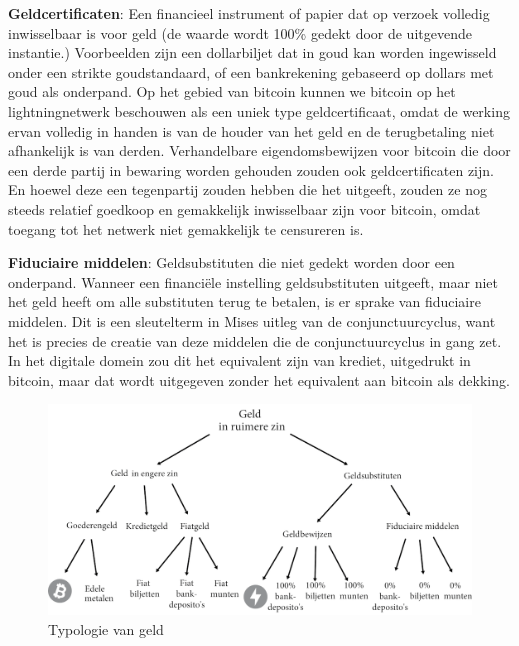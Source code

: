 \vspace{1em}\noindent\textbf{Geldcertificaten}: Een financieel instrument of papier dat op verzoek volledig inwisselbaar is voor geld (de waarde wordt 100\% gedekt door de uitgevende instantie.) Voorbeelden zijn een dollarbiljet dat in goud kan worden ingewisseld onder een strikte goudstandaard, of een bankrekening gebaseerd op dollars met goud als onderpand. Op het gebied van bitcoin kunnen we bitcoin op het lightningnetwerk beschouwen als een uniek type geldcertificaat, omdat de werking ervan volledig in handen is van de houder van het geld en de terugbetaling niet afhankelijk is van derden. Verhandelbare eigendomsbewijzen voor bitcoin die door een derde partij in bewaring worden gehouden zouden ook geldcertificaten zijn. En hoewel deze een tegenpartij zouden hebben die het uitgeeft, zouden ze nog steeds relatief goedkoop en gemakkelijk inwisselbaar zijn voor bitcoin, omdat toegang tot het netwerk niet gemakkelijk te censureren is.

\vspace{1em}\noindent\textbf{Fiduciaire middelen}: Geldsubstituten die niet gedekt worden door een onderpand. Wanneer een financiële instelling geldsubstituten uitgeeft, maar niet het geld heeft om alle substituten terug te betalen, is er sprake van fiduciaire middelen. Dit is een sleutelterm in Mises\textquotesingle{} uitleg van de conjunctuurcyclus, want het is precies de creatie van deze middelen die de conjunctuurcyclus in gang zet. In het digitale domein zou dit het equivalent zijn van krediet, uitgedrukt in bitcoin, maar dat wordt uitgegeven zonder het equivalent aan bitcoin als dekking.

\begin{figure}[H]
\centering
    \includegraphics[width=\textwidth]{figures/fig31-1.png}
    \caption[Typologie van geld]{Typologie van geld\footnotemark}
    \label{fig31}
\end{figure}

